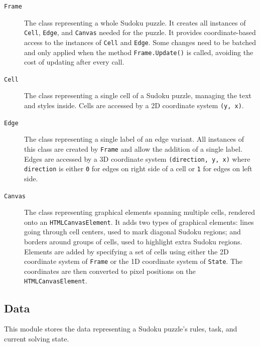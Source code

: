 \begin{description}
    \item[\texttt{Frame}]
    The class representing a whole Sudoku puzzle.
    It creates all instances of \texttt{Cell}, \texttt{Edge}, and \texttt{Canvas} needed for the puzzle.
    It provides coordinate-based access to the instances of \texttt{Cell} and \texttt{Edge}.
    Some changes need to be batched and only applied when the method \texttt{Frame.Update()} is called,
    avoiding the cost of updating after every call.

    \item[\texttt{Cell}]
    The class representing a single cell of a Sudoku puzzle, managing the text and styles inside.
    Cells are accessed by a 2D coordinate system \texttt{(y, x)}.

    \item[\texttt{Edge}]
    The class representing a single label of an edge variant.
    All instances of this class are created by \texttt{Frame} and allow the addition of a single label.
    Edges are accessed by a 3D coordinate system \texttt{(direction, y, x)} where
    \texttt{direction} is either \texttt{0} for edges on right side of a cell or \texttt{1} for edges on left side.

    \item[\texttt{Canvas}]
    The class representing graphical elements spanning multiple cells, rendered onto an \texttt{HTMLCanvasElement}.
    It adds two types of graphical elements:
    lines going through cell centers, used to mark diagonal Sudoku regions;
    and borders around groups of cells, used to highlight extra Sudoku regions.
    Elements are added by specifying a set of cells using either the 2D coordinate system
    of \texttt{Frame} or the 1D coordinate system of \texttt{State}.
    The coordinates are then converted to pixel positions on the \texttt{HTMLCanvasElement}.
\end{description}

\subsection*{Data}

This module stores the data representing a Sudoku puzzle's rules, task, and current solving state.

